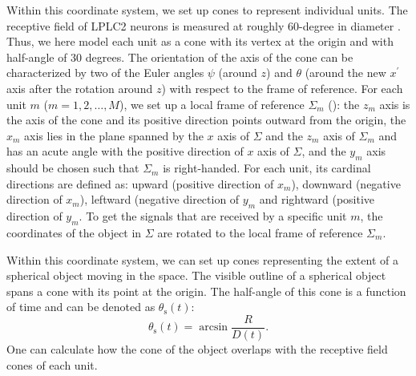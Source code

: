 \documentclass[pdftex,9pt,lineno]{elife}
\begin{document}
Within this coordinate system, we set up cones to represent individual units. The receptive field of LPLC2 neurons is measured at roughly 60-degree in diameter \citep{klapoetke2017ultra}. Thus, we here model each unit as a cone with its vertex at the origin and with half-angle of 30 degrees. The orientation of the axis of the cone can be characterized by two of the Euler angles $\psi$ (around $z$) and $\theta$ (around the new $x^{'}$ axis after the rotation around $z$) with respect to the frame of reference. For each unit $m$ ($m=1, 2, \dots, M$), we set up a local frame of reference $\Sigma_{m}$ (): the $z_{m}$ axis is the axis of the cone and its positive direction points outward from the origin, the $x_{m}$ axis lies in the plane spanned by the $x$ axis of $\Sigma$ and the $z_{m}$ axis of $\Sigma_{m}$ and has an acute angle with the positive direction of $x$ axis of $\Sigma$, and the $y_{m}$ axis should be chosen such that $\Sigma_{m}$ is right-handed. For each unit, its cardinal directions are defined as: upward (positive direction of $x_{m}$), downward (negative direction of $x_{m}$), leftward (negative direction of $y_{m}$ and rightward (positive direction of $y_{m}$. To get the signals that are received by a specific unit $m$, the coordinates of the object in $\Sigma$ are rotated to the local frame of reference $\Sigma_{m}$.

Within this coordinate system, we can set up cones representing the extent of a spherical object moving in the space. The visible outline of a spherical object spans a cone with its point at the origin. The half-angle of this cone is a function of time and can be denoted as $\theta_{\text{s}}(t)$:
\begin{equation}
\theta_{\text{s}}(t) = \arcsin{\frac{R}{D(t)}}.
\end{equation}
One can calculate how the cone of the object overlaps with the receptive field cones of each unit.
\end{document}
